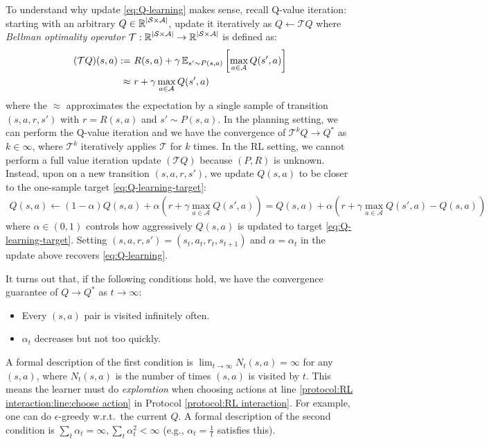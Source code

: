To understand why update \eqref{eq:Q-learning} makes sense, recall Q-value iteration: starting with an arbitrary $Q\in\operatorname{\mathbb{R}}^{|\mathcal{S}\times\mathcal{A}|}$, update it iteratively as $Q \gets \mathcal{T} Q$ where {\em Bellman optimality operator} $\mathcal{T}:\operatorname{\mathbb{R}}^{|\mathcal{S}\times\mathcal{A}|}\to\operatorname{\mathbb{R}}^{|\mathcal{S}\times\mathcal{A}|}$ is defined as:
\begin{align}
  (\mathcal{T}Q)(s,a) :=&~ R(s,a)+\gamma\operatorname{\mathbb{E}}_{s'\sim P(s,a)}\left[\max_{a\in\mathcal{A}}Q(s',a)\right] \label{eq:Bellman_optimality_operator}\\ 
  \approx &~r+\gamma\max_{a\in\mathcal{A}}Q(s',a) \label{eq:Q-learning-target} 
\end{align}
where the $\approx$ approximates the expectation by a single sample of transition $(s,a,r,s')$ with $r=R(s,a)$ and $s'\sim P(s,a)$.
In the planning setting, we can perform the Q-value iteration and we have the convergence of $\mathcal{T}^kQ\to Q^*$ as $k\in\infty$, where $\mathcal{T}^k$ iteratively applies $\mathcal{T}$ for $k$ times.
In the RL setting, we cannot perform a full value iteration update $(\mathcal{T}Q)$ because $(P,R)$ is unknown. Instead, upon on a new transition $(s,a,r,s')$, we update $Q(s,a)$ to be closer to the one-sample target \eqref{eq:Q-learning-target}:
\begin{align*}
    Q(s,a) \gets (1-\alpha) Q(s,a) + \alpha \left(r+\gamma\max_{a\in\mathcal{A}}Q(s',a)\right)
    = Q(s,a) + \alpha\left(r+\gamma\max_{a\in\mathcal{A}}Q(s',a)-Q(s,a)\right)
\end{align*}
where $\alpha\in(0,1)$ controls how aggressively $Q(s,a)$ is updated to target \eqref{eq:Q-learning-target}.
Setting $(s,a,r,s')=(s_t,a_t,r_t,s_{t+1})$ and $\alpha=\alpha_t$ in the update above recovers \eqref{eq:Q-learning}.

It turns out that, if the following conditions hold, we have the convergence guarantee of $Q \to Q^*$ as $t\to\infty$:  \begin{itemize}
    \item Every $(s,a)$ pair is visited infinitely often.
    \item $\alpha_t$ decreases but not too quickly.
\end{itemize}
A formal description of the first condition is 
$\lim_{t\to\infty}N_t(s,a)=\infty$ for any $(s,a)$, where $N_t(s,a)$ is the number of times $(s,a)$ is visited by $t$.
This means the learner must do {\em exploration} when choosing actions at line \ref{protocol:RL interaction:line:choose action} in Protocol \ref{protocol:RL interaction}. For example, one can do $\epsilon$-greedy w.r.t.~the current $Q$. 
A formal description of the second condition is $\sum_t \alpha_t=\infty, \sum_t \alpha_t^2<\infty$ (e.g., $\alpha_t=\frac{1}{t}$ satisfies this).

